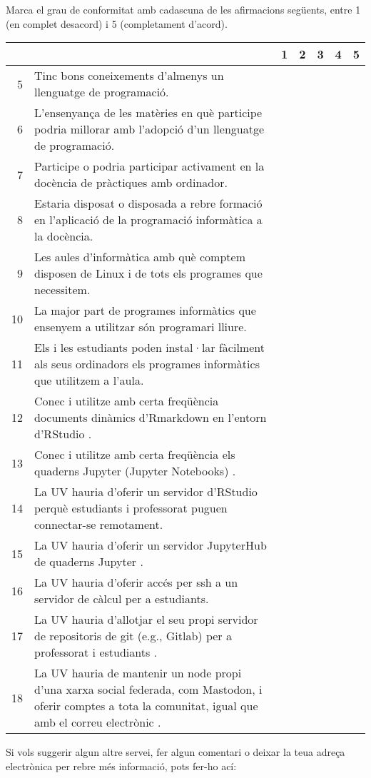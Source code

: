 \documentclass[a4paper,12pt]{article}
\begin{document}
Marca el grau de conformitat amb cadascuna de les afirmacions següents, entre 
1 (en complet desacord) i 5 (completament d'acord).

{\small
\begin{tabular}{|r|p{9cm}|c|c|c|c|c|}
\toprule
&&1&2&3&4&5\\
\midrule
5&Tinc bons coneixements d'almenys un llenguatge de programació.&&&&&\\
\midrule
6&L'ensenyança de les matèries en què participe podria millorar amb l'adopció d'un llenguatge de programació.&&&&&\\
\midrule
7&Participe o podria participar activament en la docència de pràctiques amb ordinador.&&&&&\\
\midrule
8&Estaria disposat o disposada a rebre formació en l'aplicació de la programació informàtica a la docència.&&&&&\\
\midrule
9&Les aules d'informàtica amb què comptem disposen de Linux i de tots els programes que necessitem.&&&&&\\
\midrule
10&La major part de programes informàtics que ensenyem a utilitzar són programari lliure.&&&&&\\
\midrule
11&Els i les estudiants poden instal·lar fàcilment als seus ordinadors els programes informàtics que utilitzem a l'aula.&&&&&\\
\midrule
12&Conec i utilitze amb certa freqüència documents dinàmics d'Rmarkdown en l'entorn d'RStudio \cite{RStudio}.&&&&&\\
\midrule
13&Conec i utilitze amb certa freqüència els quaderns Jupyter (Jupyter Notebooks) \cite{Barba2019}.&&&&&\\
\midrule
14&La UV hauria d'oferir un servidor d'RStudio perquè estudiants i professorat puguen connectar-se remotament.&&&&&\\
\midrule
15&La UV hauria d'oferir un servidor JupyterHub de quaderns Jupyter \cite{JupyterHub}.&&&&&\\
\midrule
16&La UV hauria d'oferir accés per \textsf{ssh} a un servidor de càlcul per a estudiants.&&&&&\\
\midrule
17&La UV hauria d'allotjar el seu propi servidor de repositoris de \textsf{git} (e.g., Gitlab) per a professorat i estudiants \cite{Paderborn2023,PereiraBraga2023}.&&&&&\\
\midrule
18&La UV hauria de mantenir un node propi d'una xarxa social federada, com Mastodon, i oferir comptes a tota la comunitat, igual que amb el correu electrònic \cite{Brembs2023,mastodon}.&&&&&\\
\bottomrule
\end{tabular}
}

Si vols suggerir algun altre servei, fer algun comentari o deixar la teua adreça electrònica per rebre més informació, pots fer-ho ací:
\vspace*{3cm}



\end{document}
